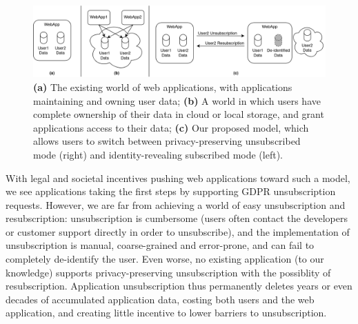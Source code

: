 \begin{figure}[ht!]
    \centering
    \includegraphics[width=\textwidth]{img/worlds}

    \caption{\textbf{(a)} The existing world of web applications, with applications maintaining and
    owning user data; \textbf{(b)} A world in which users have complete ownership of their data in cloud or local
    storage, and grant applications access to their data;
    \textbf{(c)} Our proposed model, which allows users to switch between privacy-preserving unsubscribed
    mode (right) and identity-revealing subscribed mode (left).}
    \label{fig:world}
\end{figure}

With legal and societal incentives pushing web applications toward such a model, we see applications
taking the first steps by supporting GDPR unsubscription requests. However, we are far from
achieving a world of easy unsubscription and resubscription: unsubscription is cumbersome (users
often contact the developers or customer support directly in order to unsubscribe), and the
implementation of unsubscription is manual, coarse-grained and error-prone, and can fail to
completely de-identify the user.  Even worse, no existing application (to our knowledge) supports
privacy-preserving unsubscription with the possiblity of resubscription.  Application unsubscription
thus permanently deletes years or even decades of accumulated application data, costing both users
and the web application, and creating little incentive to lower barriers to unsubscription. 

